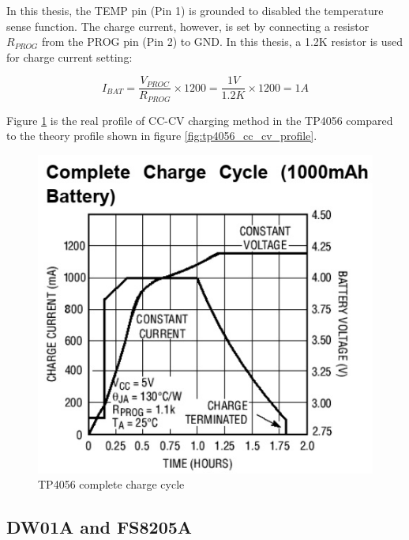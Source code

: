 \documentclass[\main/main.tex]{subfiles}
\begin{document}
In this thesis, the TEMP pin (Pin 1) is grounded to disabled the temperature sense function. The charge current, however, is set by connecting a resistor $R_{PROG}$ from the PROG pin (Pin 2) to GND. In this thesis, a 1.2K resistor is used for charge current setting:

\begin{equation}
    I_{BAT} = \frac{V_{PROC}}{R_{PROG}}\times 1200 = \frac{1V}{1.2K}\times 1200 = 1A
\end{equation}

Figure \ref{fig:tp4056_complete_charge_cycle} is the real profile of CC-CV charging method in the TP4056 compared to the theory profile shown in figure \ref{fig:tp4056_cc_cv_profile}.

\begin{figure}[H]
    \begin{center}
        \includegraphics[scale=0.8]{tp4056_complete_charge_cycle.jpg}
    \end{center}
    \caption{TP4056 complete charge cycle}
    \label{fig:tp4056_complete_charge_cycle}
\end{figure}

\subsection{DW01A and FS8205A}
\end{document}
